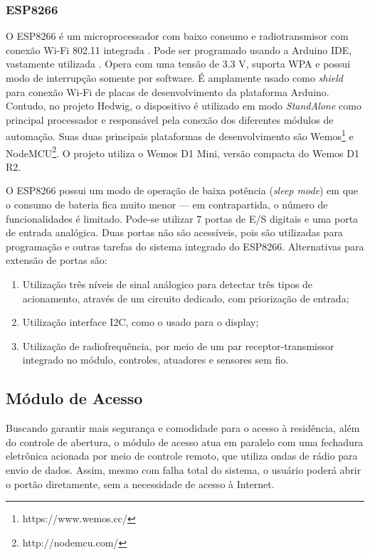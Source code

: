 \subsubsection{ESP8266 \label{subsec:esp8266}}
O ESP8266 é um microprocessador com baixo consumo e radiotransmisor com conexão Wi-Fi 802.11 integrada \cite{espressif}. Pode ser programado usando a Arduino IDE, vastamente utilizada \cite{thomsen}. Opera com uma tensão de 3.3 V, suporta WPA e possui modo de interrupção somente por software. É amplamente usado como \textit{shield} para conexão Wi-Fi de placas de desenvolvimento da plataforma Arduino. Contudo, no projeto Hedwig, o dispositivo é utilizado em modo \textit{StandAlone} como principal processador e responsável pela conexão dos diferentes módulos de automação. Suas duas principais plataformas de desenvolvimento são Wemos\footnote{https://www.wemos.cc/} e NodeMCU\footnote{http://nodemcu.com/}. O projeto utiliza o Wemos D1 Mini, versão compacta do Wemos D1 R2.

O ESP8266 possui um modo de operação de baixa potência (\textit{sleep mode}) em que o consumo de bateria fica muito menor --- em contrapartida, o número de funcionalidades é limitado. Pode-se utilizar 7 portas de E\slash{}S digitais e uma porta de entrada analógica. Duas portas não são acessíveis, pois são utilizadas para programação e outras tarefas do sistema integrado do ESP8266. Alternativas para extensão de portas são:

\begin{enumerate}
	\item Utilização três níveis de sinal análogico para detectar três tipos de acionamento, através de um circuito dedicado, com priorização de entrada;

	\item Utilização interface I2C, como o usado para o display;

	\item Utilização de radiofrequência, por meio de um par receptor-transmissor integrado no módulo, controles, atuadores e sensores sem fio.
\end{enumerate}

\subsection{Módulo de Acesso}
\label{acessomodulo}

Buscando garantir mais segurança e comodidade para o acesso à residência, além do controle de abertura, o módulo de acesso atua em paralelo com uma fechadura eletrônica acionada por meio de controle remoto, que utiliza ondas de rádio para envio de dados. Assim, mesmo com falha total do sistema, o usuário poderá abrir o portão diretamente, sem a necessidade de acesso à Internet.

